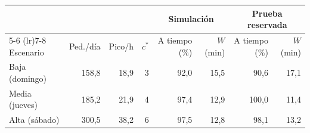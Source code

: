 {\small\setlength{\tabcolsep}{4.5pt}
\begin{tabular}{lrrrrrrr}
\toprule
 & & & & \multicolumn{2}{c}{Simulación} & \multicolumn{2}{c}{Prueba reservada} \\
\cmidrule(lr){5-6} \cmidrule(lr){7-8}
Escenario & Ped./día & Pico/h & $c^*$ & A tiempo (\%) & $W$ (min) & A tiempo (\%) & $W$ (min) \\
\midrule
Baja (domingo) & 158,8 & 18,9 & 3 & 92,0 & 15,5 & 90,6 & 17,1 \\
Media (jueves) & 185,2 & 21,9 & 4 & 97,4 & 12,9 & 100,0 & 11,4 \\
Alta (sábado) & 300,5 & 38,2 & 6 & 97,5 & 12,8 & 98,1 & 13,2 \\
\bottomrule
\end{tabular}}
